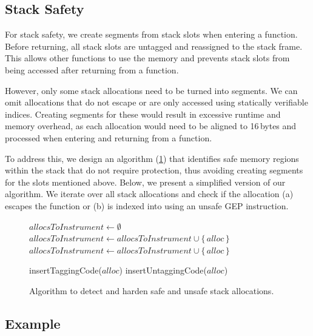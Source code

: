 \subsection{Stack Safety}
\label{subsec:stack-safety}

For stack safety, we create segments from stack slots when entering a function.
Before returning, all stack slots are untagged and reassigned to the stack frame.
This allows other functions to use the memory and prevents stack slots from being accessed after returning from a function.

However, only some stack allocations need to be turned into segments.
We can omit allocations that do not escape or are only accessed using statically verifiable indices.
Creating segments for these would result in excessive runtime and memory overhead, as each allocation would need to be aligned to 16\,bytes and processed when entering and returning from a function.

To address this, we design an algorithm (\cref{fig:stack-safety-pseudo}) that identifies safe memory regions within the stack that do not require protection, thus avoiding creating segments for the slots mentioned above.
Below, we present a simplified version of our algorithm.
We iterate over all stack allocations and check if the allocation (a) escapes the function or (b) is indexed into using an unsafe \ac{GEP} instruction.

\begin{figure}
    \begin{algorithmic}
        \State $allocsToInstrument \gets \emptyset$
                \State $allocsToInstrument \gets allocsToInstrument \cup \{\,alloc\,\}$
            \State $allocsToInstrument \gets allocsToInstrument \cup \{\,alloc\,\}$
            \EndIf
        \EndFor

            \State insertTaggingCode($alloc$)
            \State insertUntaggingCode($alloc$)
        \EndFor
    \end{algorithmic}
    \caption{Algorithm to detect and harden safe and unsafe stack allocations.}
    \label{fig:stack-safety-pseudo}
\end{figure}

\subsection{Example}
\label{subsec:example2}

